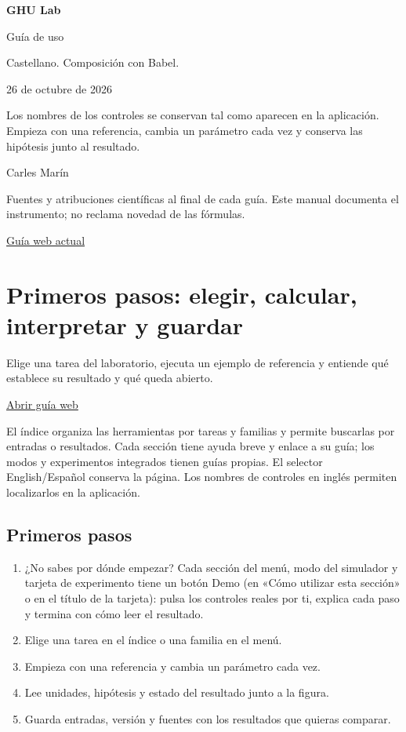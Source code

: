 \documentclass[11pt,a4paper]{article}
\begin{document}
\begin{titlepage}
{\Huge\bfseries GHU Lab\par}
\vspace{12mm}
{\LARGE Guía de uso\par}
\vspace{7mm}
Castellano. Composición con Babel.\par
26 de octubre de 2026\par
\vspace{8mm}
Los nombres de los controles se conservan tal como aparecen en la aplicación. Empieza con una referencia, cambia un parámetro cada vez y conserva las hipótesis junto al resultado.\par
\vfill
Carles Marín\par
Fuentes y atribuciones científicas al final de cada guía. Este manual documenta el instrumento; no reclama novedad de las fórmulas.\par
\href{https://karlesmarin.github.io/ghu-explorer/guide/es/index.html}{Guía web actual}
\end{titlepage}
\tableofcontents
\clearpage
\section{Primeros pasos: elegir, calcular, interpretar y guardar}
Elige una tarea del laboratorio, ejecuta un ejemplo de referencia y entiende qué establece su resultado y qué queda abierto.

\href{https://karlesmarin.github.io/ghu-explorer/guide/es/getting-started/index.html}{Abrir guía web}

El índice organiza las herramientas por tareas y familias y permite buscarlas por entradas o resultados. Cada sección tiene ayuda breve y enlace a su guía; los modos y experimentos integrados tienen guías propias. El selector English/Español conserva la página. Los nombres de controles en inglés permiten localizarlos en la aplicación.
\subsection*{Primeros pasos}
\begin{enumerate}
\item ¿No sabes por dónde empezar? Cada sección del menú, modo del simulador y tarjeta de experimento tiene un botón  Demo (en «Cómo utilizar esta sección» o en el título de la tarjeta): pulsa los controles reales por ti, explica cada paso y termina con cómo leer el resultado.
\item Elige una tarea en el índice o una familia en el menú.
\item Empieza con una referencia y cambia un parámetro cada vez.
\item Lee unidades, hipótesis y estado del resultado junto a la figura.
\item Guarda entradas, versión y fuentes con los resultados que quieras comparar.
\end{enumerate}
\end{document}
